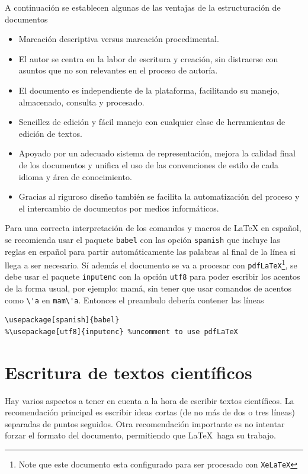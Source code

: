\documentclass{article}
\begin{document}
A continuación se establecen algunas de las ventajas de la estructuración de documentos
  \begin{itemize}
  \item   Marcación descriptiva versus marcación procedimental.
  \item   El autor se centra en la labor de escritura y creación, sin distraerse con asuntos que no son relevantes en el proceso de autoría.
  \item  El documento es independiente de la plataforma, facilitando su manejo, almacenado, consulta y procesado.
  \item   Sencillez de edición y fácil manejo con cualquier clase de herramientas de edición de textos.
  \item   Apoyado por un adecuado sistema de representación, mejora la calidad final de los documentos y unifica el uso de las convenciones de estilo de cada idioma y área de conocimiento.
  \item   Gracias al riguroso diseño también se facilita la automatización del proceso y el intercambio de documentos por medios informáticos. 
  \end{itemize}
  
Para una correcta interpretación de los comandos y macros de \LaTeX{} en español, se recomienda usar el paquete \verb|babel| con las opción \verb|spanish| que incluye las reglas en español para partir automáticamente las palabras al final de la línea si llega a ser necesario. Sí  además el documento se va a procesar con \verb|pdfLaTeX|\footnote{Note que este documento esta configurado para ser procesado con  \texttt{XeLaTeX}}, se debe usar el paquete \verb|inputenc| con la opción \verb|utf8| para poder escribir los acentos de la forma usual, por ejemplo: mamá, sin tener que usar comandos de acentos como \verb|\'a| en \verb|mam\'a|. Entonces el preambulo debería contener las líneas
\begin{lstlisting}
\usepackage[spanish]{babel}
%\usepackage[utf8]{inputenc} %uncomment to use pdfLaTeX
\end{lstlisting}
  
\section{Escritura de textos científicos}  
Hay varios aspectos a tener en cuenta a la hora de escribir textos científicos. La recomendación principal es escribir ideas cortas (de no más de dos o tres líneas) separadas de puntos seguidos. Otra recomendación importante es no intentar forzar el formato del documento, permitiendo que \LaTeX\ haga su trabajo.
\end{document}
